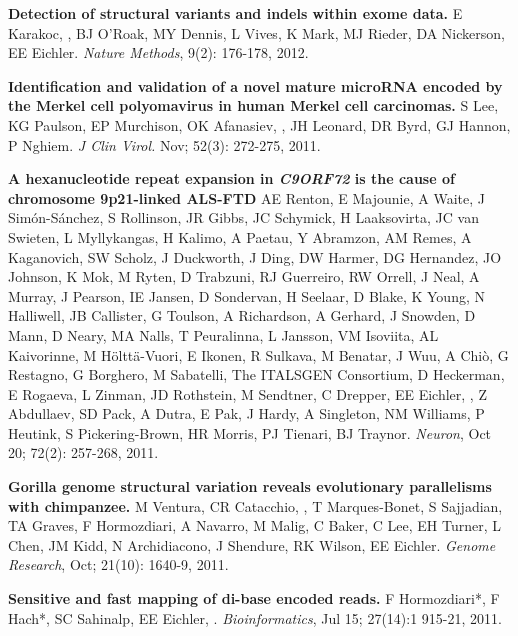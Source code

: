 \vspace{-.2cm}
    {\bf Detection of structural variants and indels within exome data.} E Karakoc, \calkan{}, BJ O'Roak, 
    MY Dennis, L Vives, K Mark, MJ Rieder, DA Nickerson, EE Eichler. {\em Nature Methods}, 9(2): 176-178, 2012.
    
\vspace{-.2cm}
    {\bf Identification and validation of a novel mature microRNA encoded by the Merkel cell polyomavirus in human Merkel cell carcinomas.}
    S Lee, KG Paulson, EP Murchison, OK Afanasiev, \calkan{}, JH Leonard, DR Byrd, GJ Hannon, 
    P Nghiem. {\em J Clin Virol.} Nov; 52(3): 272-275, 2011. 
    
\vspace{-.2cm}
    {\bf A hexanucleotide repeat expansion in \textit{C9ORF72} is the cause of chromosome 9p21-linked ALS-FTD}  
    AE Renton, E Majounie, A Waite, J Simón-Sánchez, S Rollinson, JR Gibbs, JC Schymick, H Laaksovirta, JC van Swieten, L Myllykangas, 
    H Kalimo, A Paetau, Y Abramzon, AM Remes, A Kaganovich, SW Scholz, J Duckworth, J Ding, DW Harmer, DG Hernandez, JO Johnson, 
    K Mok, M Ryten, D Trabzuni, RJ Guerreiro, RW Orrell, J Neal, A Murray, J Pearson, IE Jansen, D Sondervan, H Seelaar, D Blake, 
    K Young, N Halliwell, JB Callister, G Toulson, A Richardson, A Gerhard, J Snowden, D Mann, D Neary, MA Nalls, T Peuralinna, 
    L Jansson, VM Isoviita, AL Kaivorinne, M Hölttä-Vuori, E Ikonen, R Sulkava, M Benatar, J Wuu, A Chiò, G Restagno, 
    G Borghero, M Sabatelli, The ITALSGEN Consortium, D Heckerman, E Rogaeva, L Zinman, JD Rothstein, M Sendtner, C Drepper, EE Eichler, 
    \calkan{}, Z Abdullaev, SD Pack, A Dutra, E Pak, J Hardy, A Singleton, NM Williams, P Heutink, S Pickering-Brown, 
    HR Morris, PJ Tienari, BJ Traynor. {\em Neuron}, Oct 20; 72(2): 257-268, 2011.
    
\vspace{-.2cm}
    {\bf Gorilla genome structural variation reveals evolutionary parallelisms with chimpanzee.}
    M Ventura, CR Catacchio, \calkan{}, T Marques-Bonet, S Sajjadian, TA Graves, F Hormozdiari, A Navarro, 
    M Malig, C Baker, C Lee, EH Turner, L Chen, JM Kidd, N Archidiacono, J Shendure, RK Wilson, EE Eichler.
    {\em Genome Research}, Oct; 21(10): 1640-9, 2011.

\vspace{-.2cm}
    {\bf Sensitive and fast mapping of di-base encoded reads.}
    F Hormozdiari*, F Hach*, SC Sahinalp, EE Eichler, \calkan{}.
    {\em Bioinformatics}, Jul 15; 27(14):1 915-21, 2011.

